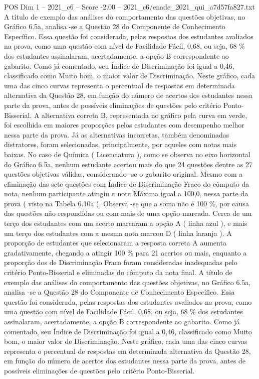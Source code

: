 \begin{textsample}{POS Dim 1 – 2021\_c6 – Score -2.00 – 2021\_c6/enade\_2021\_qui\_a7d57fa827.txt}
A título de exemplo das análises do comportamento das questões objetivas, no Gráfico 6.5a, analisa -se a Questão 28 do Componente de Conhecimento Específico.
Essa questão foi considerada, pelas respostas dos estudantes avaliados na prova, como uma questão com nível de Facilidade Fácil, 0,68, ou seja, 68 \% dos estudantes assinalaram, acertadamente, a opção B correspondente ao gabarito.
Como já comentado, seu Índice de Discriminação foi igual a 0,46, classificado como Muito bom, o maior valor de Discriminação.
Neste gráfico, cada uma das cinco curvas representa o percentual de respostas em determinada alternativa da Questão 28, em função do número de acertos dos estudantes nessa parte da prova, antes de possíveis eliminações de questões pelo critério Ponto-Bisserial.
A alternativa correta B, representada no gráfico pela curva em verde, foi escolhida em maiores proporções pelos estudantes com desempenho melhor nessa parte da prova.
Já as alternativas incorretas, também denominadas distratores, foram selecionadas, principalmente, por aqueles com notas mais baixas.
No caso de Química ( Licenciatura ), como se observa no eixo horizontal do Gráfico 6.5a, nenhum estudante acertou mais do que 24 questões dentre as 27 questões objetivas válidas, considerando -se o gabarito original.
Mesmo com a eliminação das sete questões com Índice de Discriminação Fraco do cômputo da nota, nenhum participante atingiu a nota Máxima igual a 100,0, nessa parte da prova ( visto na Tabela 6.10a ).
Observa -se que a soma não é 100 \%, por causa das questões não respondidas ou com mais de uma opção marcada.
Cerca de um terço dos estudantes com um acerto marcaram a opção A ( linha azul ), e mais um terço dos estudantes com a mesma nota marcou D ( linha laranja ).
A proporção de estudantes que selecionaram a resposta correta A aumenta gradativamente, chegando a atingir 100 \% para 21 acertos ou mais, enquanto a proporção dos de Discriminação Fraco foram consideradas inadequadas pelo critério Ponto-Bisserial e eliminadas do cômputo da nota final.
A título de exemplo das análises do comportamento das questões objetivas, no Gráfico 6.5a, analisa -se a Questão 28 do Componente de Conhecimento Específico.
Essa questão foi considerada, pelas respostas dos estudantes avaliados na prova, como uma questão com nível de Facilidade Fácil, 0,68, ou seja, 68 \% dos estudantes assinalaram, acertadamente, a opção B correspondente ao gabarito.
Como já comentado, seu Índice de Discriminação foi igual a 0,46, classificado como Muito bom, o maior valor de Discriminação.
Neste gráfico, cada uma das cinco curvas representa o percentual de respostas em determinada alternativa da Questão 28, em função do número de acertos dos estudantes nessa parte da prova, antes de possíveis eliminações de questões pelo critério Ponto-Bisserial.

\end{textsample}
